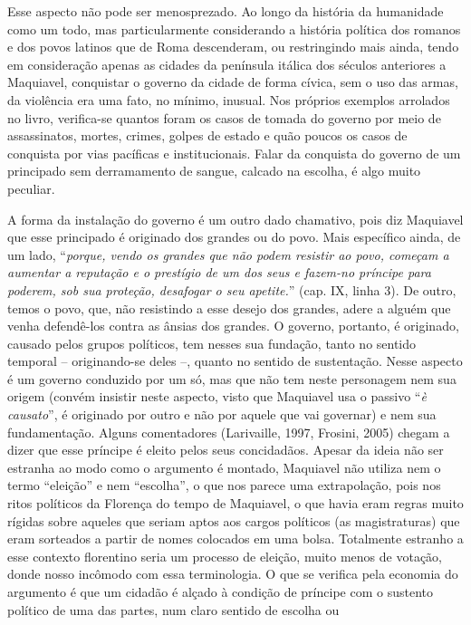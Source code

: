Esse aspecto não pode ser menosprezado. Ao longo da história da
humanidade como um todo, mas particularmente considerando a história
política dos romanos e dos povos latinos que de Roma descenderam, ou
restringindo mais ainda, tendo em consideração apenas as cidades da
península itálica dos séculos anteriores a Maquiavel, conquistar o
governo da cidade de forma cívica, sem o uso das armas, da violência era
uma fato, no mínimo, inusual. Nos próprios exemplos arrolados no livro,
verifica-se quantos foram os casos de tomada do governo por meio de
assassinatos, mortes, crimes, golpes de estado e quão poucos os casos de
conquista por vias pacíficas e institucionais. Falar da conquista do
governo de um principado sem derramamento de sangue, calcado na escolha,
é algo muito peculiar.

A forma da instalação do governo é um outro dado chamativo, pois diz
Maquiavel que esse principado é originado dos grandes ou do povo. Mais
específico ainda, de um lado, ``\emph{porque, vendo os grandes que não
podem resistir ao povo, começam a aumentar a reputação e o prestígio de
um dos seus e fazem-no príncipe para poderem, sob sua proteção,
desafogar o seu apetite.}'' (cap. IX, linha 3). De outro, temos o povo,
que, não resistindo a esse desejo dos grandes, adere a alguém que venha
defendê-los contra as ânsias dos grandes. O governo, portanto, é
originado, causado pelos grupos políticos, tem nesses sua fundação,
tanto no sentido temporal -- originando-se deles --, quanto no sentido
de sustentação. Nesse aspecto é um governo conduzido por um só, mas que
não tem neste personagem nem sua origem (convém insistir neste aspecto,
visto que Maquiavel usa o passivo ``\emph{è causato}'', é originado por
outro e não por aquele que vai governar) e nem sua fundamentação. Alguns
comentadores (Larivaille, 1997, Frosini, 2005) chegam a dizer que esse
príncipe é eleito pelos seus concidadãos. Apesar da ideia não ser
estranha ao modo como o argumento é montado, Maquiavel não utiliza nem o
termo ``eleição'' e nem ``escolha'', o que nos parece uma extrapolação,
pois nos ritos políticos da Florença do tempo de Maquiavel, o que havia
eram regras muito rígidas sobre aqueles que seriam aptos aos cargos
políticos (as magistraturas) que eram sorteados a partir de nomes
colocados em uma bolsa. Totalmente estranho a esse contexto florentino
seria um processo de eleição, muito menos de votação, donde nosso
incômodo com essa terminologia. O que se verifica pela economia do
argumento é que um cidadão é alçado à condição de príncipe com o
sustento político de uma das partes, num claro sentido de escolha ou
